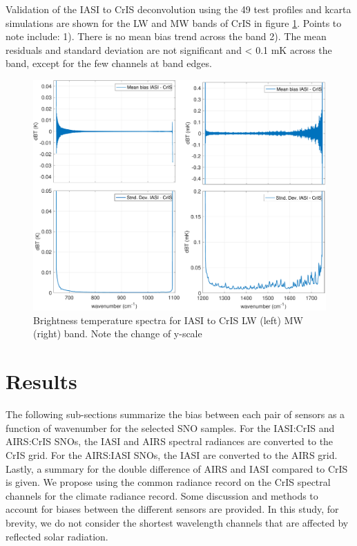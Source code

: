\documentclass[twocolumn,10pt]{article}
\begin{document}

Validation of the IASI to CrIS deconvolution using the 49 test profiles and kcarta simulations are shown for the LW and MW bands of CrIS in figure \ref{fig:2a}. Points to note include: 1). There is no mean bias trend across the band 2). The mean residuals and standard deviation are not significant and < 0.1 mK across the band, except for the few channels at band edges.

\begin{figure}[htb]
\centering
\includegraphics[width=\linewidth]{./figs/iasi2cris_validation_lw_mw.pdf}
\caption{
  Brightness temperature spectra for IASI to CrIS LW (left) MW (right) band. Note the change of y-scale}
\label{fig:2a}
\end{figure}



\section{Results}
The following sub-sections summarize the bias between each pair of sensors as a function of wavenumber for the selected SNO samples. For the IASI:CrIS and AIRS:CrIS SNOs, the IASI and AIRS spectral radiances are converted to the CrIS grid.  For the AIRS:IASI SNOs, the IASI are converted to the AIRS grid. Lastly, a summary for the double difference of AIRS and IASI compared to CrIS is given. We propose using the common radiance record on the CrIS spectral channels for the climate radiance record. Some discussion and methods to account for biases between the different sensors are provided. In this study, for brevity, we do not consider the shortest wavelength channels that are affected by reflected solar radiation.
\end{document}
